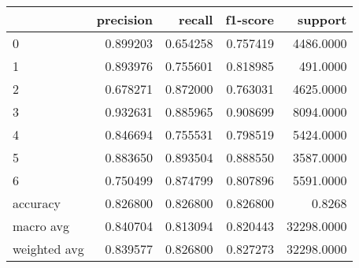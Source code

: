 \begin{tabular}{lrrrr}
\toprule
{} &  precision &    recall &  f1-score &     support \\
\midrule
0            &   0.899203 &  0.654258 &  0.757419 &   4486.0000 \\
1            &   0.893976 &  0.755601 &  0.818985 &    491.0000 \\
2            &   0.678271 &  0.872000 &  0.763031 &   4625.0000 \\
3            &   0.932631 &  0.885965 &  0.908699 &   8094.0000 \\
4            &   0.846694 &  0.755531 &  0.798519 &   5424.0000 \\
5            &   0.883650 &  0.893504 &  0.888550 &   3587.0000 \\
6            &   0.750499 &  0.874799 &  0.807896 &   5591.0000 \\
accuracy     &   0.826800 &  0.826800 &  0.826800 &      0.8268 \\
macro avg    &   0.840704 &  0.813094 &  0.820443 &  32298.0000 \\
weighted avg &   0.839577 &  0.826800 &  0.827273 &  32298.0000 \\
\bottomrule
\end{tabular}
